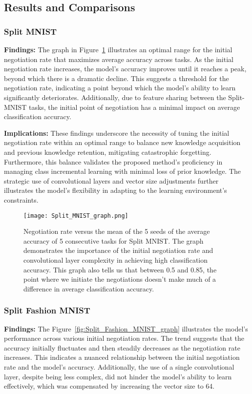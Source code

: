 \documentclass{article}
\begin{document}
\subsection{Results and Comparisons}

\subsubsection{Split MNIST}
\textbf{Findings:} The graph in Figure~\ref{fig:Split_MNIST_graph} illustrates an optimal range for the initial negotiation rate that maximizes average accuracy across tasks. As the initial negotiation rate increases, the model's accuracy improves until it reaches a peak, beyond which there is a dramatic decline. This suggests a threshold for the negotiation rate, indicating a point beyond which the model's ability to learn significantly deteriorates. Additionally, due to feature sharing between the Split-MNIST tasks, the initial point of negotiation has a minimal impact on average classification accuracy. 

\textbf{Implications:} These findings underscore the necessity of tuning the initial negotiation rate within an optimal range to balance new knowledge acquisition and previous knowledge retention, mitigating catastrophic forgetting. Furthermore, this balance validates the proposed method's proficiency in managing class incremental learning with minimal loss of prior knowledge. The strategic use of convolutional layers and vector size adjustments further illustrates the model's flexibility in adapting to the learning environment's constraints.

\begin{figure}[htbp]
\centering
\texttt{[image: Split\_MNIST\_graph.png]}
\caption{Negotiation rate versus the mean of the 5 seeds of the average accuracy of 5 consecutive tasks for Split MNIST. The graph demonstrates the importance of the initial negotiation rate and convolutional layer complexity in achieving high classification accuracy. This graph also tells us that between 0.5 and 0.85, the point where we initiate the negotiations doesn't make much of a difference in average classification accuracy.}
\label{fig:Split_MNIST_graph}
\end{figure}

\subsubsection{Split Fashion MNIST}
\textbf{Findings:} The Figure~\ref{fig:Split_Fashion_MNIST_graph} illustrates the model's performance across various initial negotiation rates. The trend suggests that the accuracy initially fluctuates and then steadily decreases as the negotiation rate increases. This indicates a nuanced relationship between the initial negotiation rate and the model's accuracy. Additionally, the use of a single convolutional layer, despite being less complex, did not hinder the model's ability to learn effectively, which was compensated by increasing the vector size to 64.
\end{document}
